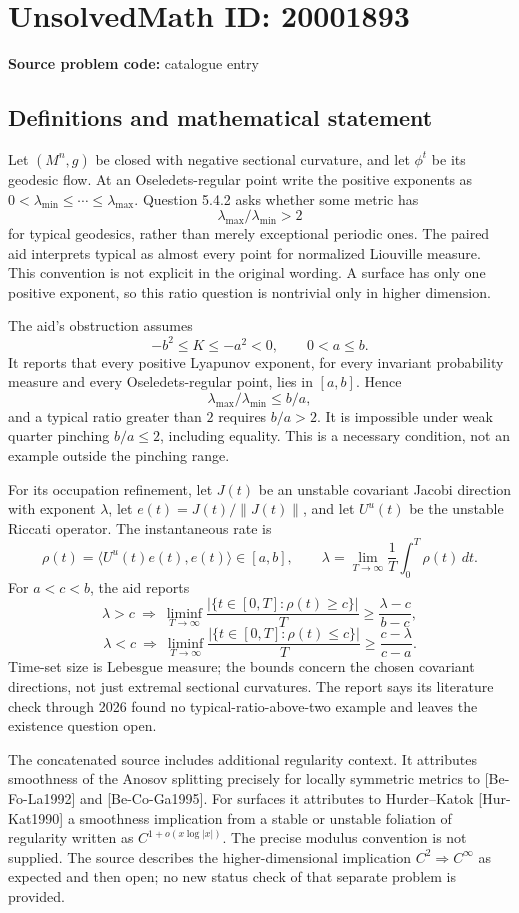 \documentclass[11pt]{article}
\begin{document}
\section*{UnsolvedMath ID: 20001893}
\textbf{Source problem code:} catalogue entry
\subsection{Definitions and mathematical statement}
Let \((M^n,g)\) be closed with negative sectional curvature, and let \(\phi^t\) be its geodesic flow. At an Oseledets-regular point write the positive exponents as
\(0<\lambda_{\min}\leq\cdots\leq\lambda_{\max}\).
Question 5.4.2 asks whether some metric has
\[
 \lambda_{\max}/\lambda_{\min}>2
\]
for typical geodesics, rather than merely exceptional periodic ones. The paired aid interprets typical as almost every point for normalized Liouville measure. This convention is not explicit in the original wording. A surface has only one positive exponent, so this ratio question is nontrivial only in higher dimension.

The aid's obstruction assumes
\[
 -b^2\leq K\leq-a^2<0,\qquad0<a\leq b.
\]
It reports that every positive Lyapunov exponent, for every invariant probability measure and every Oseledets-regular point, lies in \([a,b]\). Hence
\[
 \lambda_{\max}/\lambda_{\min}\leq b/a,
\]
and a typical ratio greater than \(2\) requires \(b/a>2\). It is impossible under weak quarter pinching \(b/a\leq2\), including equality. This is a necessary condition, not an example outside the pinching range.

For its occupation refinement, let \(J(t)\) be an unstable covariant Jacobi direction with exponent \(\lambda\), let \(e(t)=J(t)/\|J(t)\|\), and let \(U^u(t)\) be the unstable Riccati operator. The instantaneous rate is
\[
 \rho(t)=\langle U^u(t)e(t),e(t)\rangle\in[a,b],\qquad
 \lambda=\lim_{T\to\infty}\frac1T\int_0^T\rho(t)\,dt.
\]
For \(a<c<b\), the aid reports
\[
 \lambda>c\ \Longrightarrow\
 \liminf_{T\to\infty}\frac{|\{t\in[0,T]:\rho(t)\geq c\}|}{T}
 \geq\frac{\lambda-c}{b-c},
\]
\[
 \lambda<c\ \Longrightarrow\
 \liminf_{T\to\infty}\frac{|\{t\in[0,T]:\rho(t)\leq c\}|}{T}
 \geq\frac{c-\lambda}{c-a}.
\]
Time-set size is Lebesgue measure; the bounds concern the chosen covariant directions, not just extremal sectional curvatures. The report says its literature check through 2026 found no typical-ratio-above-two example and leaves the existence question open.

The concatenated source includes additional regularity context. It attributes smoothness of the Anosov splitting precisely for locally symmetric metrics to [Be-Fo-La1992] and [Be-Co-Ga1995]. For surfaces it attributes to Hurder--Katok [Hur-Kat1990] a smoothness implication from a stable or unstable foliation of regularity written as \(C^{1+o(x\log|x|)}\). The precise modulus convention is not supplied. The source describes the higher-dimensional implication \(C^2\Rightarrow C^\infty\) as expected and then open; no new status check of that separate problem is provided.
\end{document}
